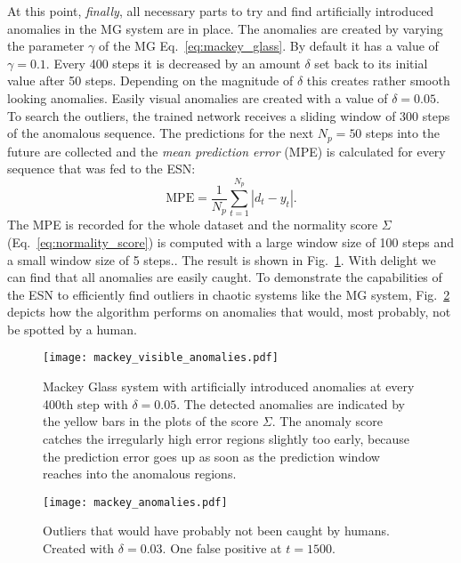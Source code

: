 At this point, \emph{finally}, all necessary parts to try and find artificially
introduced anomalies in the MG system are in place. The anomalies are created
by varying the parameter $\gamma$ of the MG Eq.~\ref{eq:mackey_glass}.  By
default it has a value of $\gamma = 0.1$.  Every 400 steps it is decreased by
an amount $\delta$ set back to its initial value after 50 steps. Depending on
the magnitude of $\delta$ this creates rather smooth looking anomalies. Easily
visual anomalies are created with a value of $\delta = 0.05$. To search the
outliers, the trained network receives a sliding window of 300 steps of the
anomalous sequence.  The predictions for the next $N_p = 50$ steps into the
future are collected and the \emph{mean prediction error} (MPE) is calculated
for every sequence that was fed to the ESN:
\begin{equation}
  \text{MPE} = \frac{1}{N_p} \sum_{t=1}^{N_p} | d_t - y_t |.
\end{equation}
The MPE is recorded for the whole dataset and the normality score $\Sigma$
(Eq.~\ref{eq:normality_score}) is computed with a large window size of 100
steps and a small window size of 5 steps..  The result is shown in
Fig.~\ref{fig:mackey_visible_anomalies}. With delight we can find that all
anomalies are easily caught.  To demonstrate the capabilities of the ESN to
efficiently find outliers in chaotic systems like the MG system,
Fig.~\ref{fig:mackey_anomalies} depicts how the algorithm performs on
anomalies that would, most probably, not be spotted by a human.

\begin{figure}
  \centering
  \texttt{[image: mackey\_visible\_anomalies.pdf]}
  \caption{Mackey Glass system with artificially introduced anomalies at every
    400th step with $\delta=0.05$. The detected anomalies are indicated by the
    yellow bars in the plots of the score $\Sigma$. The anomaly score catches
    the irregularly high error regions slightly too early, because the
    prediction error goes up as soon as the prediction window reaches into the
  anomalous regions.}
  \label{fig:mackey_visible_anomalies}
\end{figure}

\begin{figure}
  \centering
  \texttt{[image: mackey\_anomalies.pdf]}
  \caption{Outliers that would have probably not been caught by humans. Created
  with $\delta = 0.03$. One false positive at $t=1500$.}
  \label{fig:mackey_anomalies}
\end{figure}

